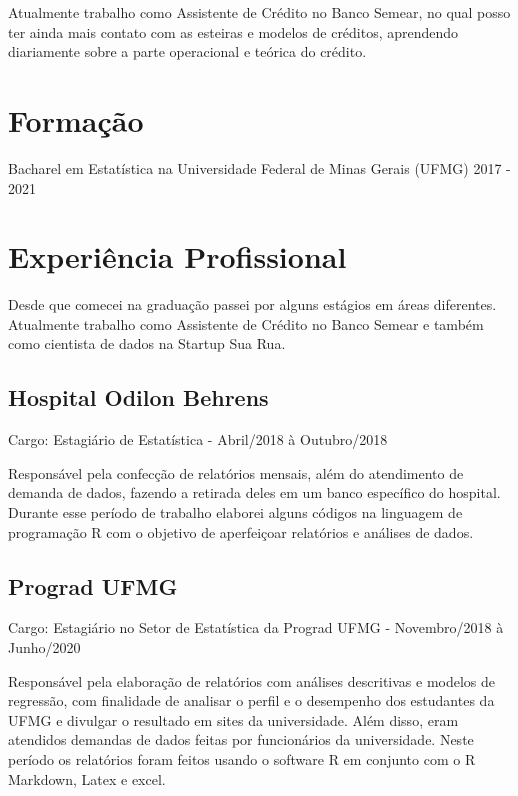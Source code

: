 \documentclass[
]{book}
\begin{document}
Atualmente trabalho como Assistente de Crédito no Banco Semear, no qual posso ter ainda mais contato com as esteiras e modelos de créditos, aprendendo diariamente sobre a parte operacional e teórica do crédito.

\hypertarget{formauxe7uxe3o}{%
\section{Formação}\label{formauxe7uxe3o}}

Bacharel em Estatística na Universidade Federal de Minas Gerais (UFMG) 2017 - 2021

\hypertarget{experiuxeancia-profissional}{%
\section{Experiência Profissional}\label{experiuxeancia-profissional}}

Desde que comecei na graduação passei por alguns estágios em áreas diferentes. Atualmente trabalho como Assistente de Crédito no Banco Semear e também como cientista de dados na Startup Sua Rua.

\hypertarget{hospital-odilon-behrens}{%
\subsection{Hospital Odilon Behrens}\label{hospital-odilon-behrens}}

Cargo: Estagiário de Estatística - Abril/2018 à Outubro/2018

Responsável pela confecção de relatórios mensais, além do atendimento de demanda de dados, fazendo a retirada deles em um banco específico do hospital. Durante esse período de trabalho elaborei alguns códigos na linguagem de programação R com o objetivo de aperfeiçoar relatórios e análises de dados.

\hypertarget{prograd-ufmg}{%
\subsection{Prograd UFMG}\label{prograd-ufmg}}

Cargo: Estagiário no Setor de Estatística da Prograd UFMG - Novembro/2018 à Junho/2020

Responsável pela elaboração de relatórios com análises descritivas e modelos de regressão, com finalidade de analisar o perfil e o desempenho dos estudantes da UFMG e divulgar o resultado em sites da universidade. Além disso, eram atendidos demandas de dados feitas por funcionários da universidade. Neste período os relatórios foram feitos usando o software R em conjunto com o R Markdown, Latex e excel.
\end{document}
